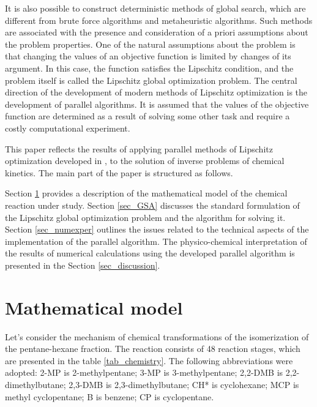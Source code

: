 \documentclass[mathematics,article,submit,pdftex,moreauthors]{Definitions/mdpi}
\begin{document}
It is also possible to construct deterministic methods of global search, which are different from brute force algorithms and metaheuristic algorithms. Such methods are associated with the presence and consideration of a priori assumptions about the problem properties. 
One of the natural assumptions about the problem is that changing the values of an objective function is limited by changes of its argument. In this case, the function satisfies the Lipschitz condition, and the problem itself is called the Lipschitz global optimization problem. The central direction of the development of modern methods of Lipschitz optimization is the development of parallel algorithms. It is assumed that the values of the objective function are determined as a result of solving some other task and require a costly computational experiment.


This paper reflects the results of applying parallel methods of Lipschitz optimization developed in \cite{Barkalov2016,Strongin2018,Sysoyev2017}, to the solution of inverse problems of chemical kinetics.  
The main part of the paper is structured as follows. 

Section \ref{sec_matmodel} provides a description of the mathematical model of the chemical reaction under study. Section \ref{sec_GSA} discusses the standard formulation of the Lipschitz global optimization problem and the algorithm for solving it. Section \ref{sec_numexper} outlines the issues related to the technical aspects of the implementation of the parallel algorithm. The physico-chemical interpretation of the results of numerical calculations using the developed parallel algorithm is presented in the Section \ref{sec_discussion}. 

\section{Mathematical model}\label{sec_matmodel}

Let's consider the mechanism of chemical transformations of the isomerization of the pentane-hexane fraction. The reaction consists of 48 reaction stages, which are presented in the table \ref{tab_chemistry}. The following abbreviations were adopted: 2-MP is 2-methylpentane; 3-MP is 3-methylpentane; 2,2-DMB is 2,2-dimethylbutane; 2,3-DMB is 2,3-dimethylbutane; CH* is cyclohexane; MCP is methyl cyclopentane; B is benzene; CP is cyclopentane.
\end{document}
